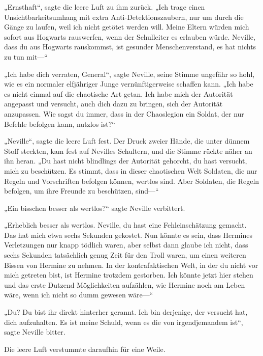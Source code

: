 {„Ernsthaft“, sagte die leere Luft zu ihm zurück. „Ich trage einen Unsichtbarkeitsumhang mit extra Anti-Detektionszaubern, nur um durch die Gänge zu laufen, weil ich nicht getötet werden will. Meine Eltern würden mich sofort aus Hogwarts rauswerfen, wenn der Schulleiter es erlauben würde. Neville, dass du aus Hogwarts rauskommst, ist gesunder Menschenverstand, es hat nichts zu tun mit—“

„Ich habe dich verraten, General“, sagte Neville, seine Stimme ungefähr so hohl, wie es ein normaler elfjähriger Junge vernünftigerweise schaffen kann. „Ich habe es nicht einmal auf die chaotische Art getan. Ich habe mich der Autorität angepasst und versucht, auch dich dazu zu bringen, sich der Autorität anzupassen. Wie sagst du immer, dass in der Chaoslegion ein Soldat, der nur Befehle befolgen kann, nutzlos ist?“

„Neville“, sagte die leere Luft fest. Der Druck zweier Hände, die unter dünnem Stoff steckten, kam fest auf Nevilles Schultern, und die Stimme rückte näher an ihn heran. „Du hast nicht blindlings der Autorität gehorcht, du hast versucht, mich zu beschützen. Es stimmt, dass in dieser chaotischen Welt Soldaten, die nur Regeln und Vorschriften befolgen können, wertlos sind. Aber Soldaten, die Regeln befolgen, um ihre Freunde zu beschützen, sind—“

„Ein bisschen besser als wertlos?“ sagte Neville verbittert.

„Erheblich besser als wertlos. Neville, du hast eine Fehleinschätzung gemacht. Das hat mich etwa sechs Sekunden gekostet. Nun könnte es sein, dass Hermines Verletzungen nur knapp tödlich waren, aber selbst dann glaube ich nicht, dass sechs Sekunden tatsächlich genug Zeit für den Troll waren, um einen weiteren Bissen von Hermine zu nehmen. In der kontrafaktischen Welt, in der du nicht vor mich getreten bist, ist Hermine trotzdem gestorben. Ich könnte jetzt hier stehen und das erste Dutzend Möglichkeiten aufzählen, wie Hermine noch am Leben wäre, wenn ich nicht so dumm gewesen wäre—“

„Du? Du bist ihr direkt hinterher gerannt. Ich bin derjenige, der versucht hat, dich aufzuhalten. Es ist meine Schuld, wenn es die von irgendjemandem ist“, sagte Neville bitter.

Die leere Luft verstummte daraufhin für eine Weile.

}

